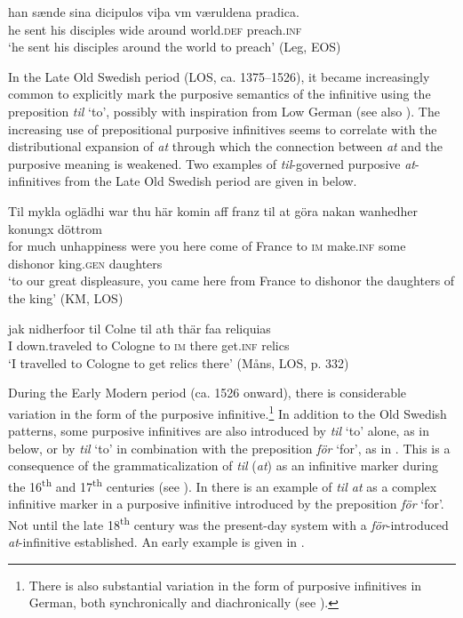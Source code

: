 \documentclass[output=paper]{langscibook}
\begin{document}
\ex \label{ex:kalm:9b}
\gll han sænde sina dicipulos viþa vm væruldena pradica.\\ 
 he sent his disciples wide around world.\textsc{def} preach.\textsc{inf}\\
\glt ‘he sent his disciples around the world to preach’ (Leg, EOS)
\z 
\z 

In the Late Old Swedish period (LOS, ca. 1375–1526), it became increasingly common to explicitly mark the purposive semantics of the infinitive using the preposition \textit{til} ‘to’, possibly with inspiration from Low German (see also ). The increasing use of prepositional purposive infinitives seems to correlate with the distributional expansion of \textit{at} through which the connection between \textit{at} and the purposive meaning is weakened. Two examples of \textit{til}{}-governed purposive \textit{at}{}-infinitives from the Late Old Swedish period are given in  below. 

\ea
\label{ex:kalm:10}
\ea  \label{ex:kalm:10a}
\gll Til mykla oglädhi war thu här komin aff franz til at göra nakan wanhedher konungx döttrom\\
for much unhappiness were you here come of France to \textsc{im} make.\textsc{inf} some dishonor king.\textsc{gen} daughters\\
\glt ‘to our great displeasure, you came here from France to dishonor the daughters of the king’ (KM, LOS)

\ex\label{ex:kalm:10b}
\gll jak nidherfoor til Colne til ath thär faa reliquias\\
 I down.traveled to Cologne to \textsc{im} there get.\textsc{inf} relics\\
\glt ‘I travelled to Cologne to get relics there’ (Måns, LOS, p. 332)
\z 
\z 


During the Early Modern period (ca. 1526 onward), there is considerable variation in the form of the purposive infinitive.\footnote{There is also substantial variation in the form of purposive infinitives in German, both synchronically and diachronically (see \citealt{Demske2011}).}  In addition to the Old Swedish patterns, some purposive infinitives are also introduced by \textit{til} ‘to’ alone, as in  below, or by \textit{til} ‘to’ in combination with the preposition \textit{för} ‘for’, as in . This is a consequence of the grammaticalization of \textit{til} (\textit{at}) as an infinitive marker during the 16\textsuperscript{th} and 17\textsuperscript{th} centuries (see \cites[]{Kalm2014}[]{Kalm2016Prepositioner}[203–221]{Kalm2016Satsekvivalenta}). In  there is an example of \textit{til at} as a complex infinitive marker in a purposive infinitive introduced by the preposition \textit{för} ‘for’. Not until the late 18\textsuperscript{th} century was the present-day system with a \textit{för}{}-introduced \textit{at}{}-infinitive established. An early example is given in . 
\end{document}
